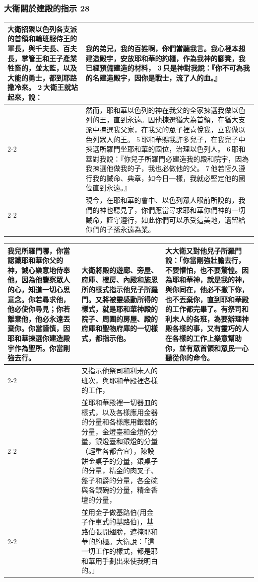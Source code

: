 \subsubsection{大衛關於建殿的指示 28}
\begin{table}[H]
\centering
\begin{tabular}{p{2.75cm}|p{}}\hline\hline
\multirow{4}{2.86cm}{大衛招聚以色列各支派的首領和輪班服侍王的軍長，與千夫長、百夫長，掌管王和王子產業牲畜的，並太監，以及大能的勇士，都到耶路撒冷來。 2 大衛王就站起來，說：}
&我的弟兄，我的百姓啊，你們當聽我言。我心裡本想建造殿宇，安放耶和華的約櫃，作為我神的腳凳，我已經預備建造的材料， 3 只是神對我說：『你不可為我的名建造殿宇，因你是戰士，流了人的血。』\\\cline{2-2}
&然而，耶和華以色列的神在我父的全家揀選我做以色列的王，直到永遠。因他揀選猶大為首領，在猶大支派中揀選我父家，在我父的眾子裡喜悅我，立我做以色列眾人的王。 5 耶和華賜我許多兒子，在我兒子中揀選所羅門坐耶和華的國位，治理以色列人。 6 耶和華對我說：『你兒子所羅門必建造我的殿和院宇，因為我揀選他做我的子，我也必做他的父。 7 他若恆久遵行我的誡命、典章，如今日一樣，我就必堅定他的國位直到永遠。』\\\cline{2-2}
&現今，在耶和華的會中、以色列眾人眼前所說的，我們的神也聽見了，你們應當尋求耶和華你們神的一切誡命，謹守遵行，如此你們可以承受這美地，遺留給你們的子孫永遠為業。\\\hline
\end{tabular}
\end{table}	 


\begin{table}[H]
\centering
\begin{tabular}{p{}|p{9.5cm}|p{}}\hline\hline
\multirow{4}{3.1cm}{我兒所羅門哪，你當認識耶和華你父的神，誠心樂意地侍奉他，因為他鑒察眾人的心，知道一切心思意念。你若尋求他，他必使你尋見；你若離棄他，他必永遠丟棄你。你當謹慎，因耶和華揀選你建造殿宇作為聖所。你當剛強去行。}
&大衛將殿的遊廊、旁屋、府庫、樓房、內殿和施恩所的樣式指示他兒子所羅門。又將被靈感動所得的樣式，就是耶和華神殿的院子、周圍的房屋、殿的府庫和聖物府庫的一切樣式，都指示他。&\multirow{4}{4.1cm}{大大衛又對他兒子所羅門說：「你當剛強壯膽去行，不要懼怕，也不要驚惶。因為耶和華神，就是我的神，與你同在，他必不撇下你，也不丟棄你，直到耶和華殿的工作都完畢了。有祭司和利未人的各班，為要辦理神殿各樣的事，又有靈巧的人在各樣的工作上樂意幫助你，並有眾首領和眾民一心聽從你的命令。}\\\cline{2-2}
&又指示他祭司和利未人的班次，與耶和華殿裡各樣的工作，&\\\cline{2-2}
&並耶和華殿裡一切器皿的樣式，以及各樣應用金器的分量和各樣應用銀器的分量，金燈臺和金燈的分量，銀燈臺和銀燈的分量（輕重各都合宜），陳設餅金桌子的分量，銀桌子的分量，精金的肉叉子、盤子和爵的分量，各金碗與各銀碗的分量，精金香壇的分量，&\\\cline{2-2}
&並用金子做基路伯(用金子作車式的基路伯)，基路伯張開翅膀，遮掩耶和華的約櫃。大衛說：「這一切工作的樣式，都是耶和華用手劃出來使我明白的。」&\\\hline
\end{tabular}
\end{table}	 


